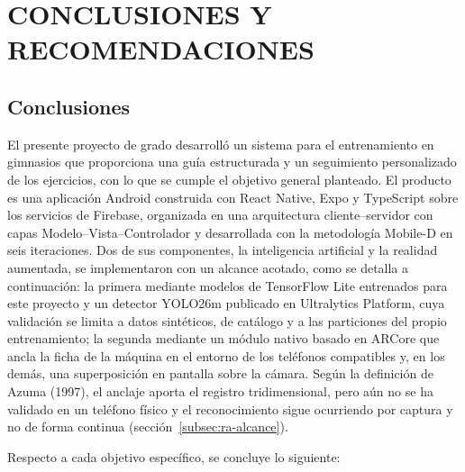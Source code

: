 \chapter{CONCLUSIONES Y RECOMENDACIONES}
\label{cap:conclusiones}

\section{Conclusiones}
\label{sec:conclusiones}

El presente proyecto de grado desarrolló un sistema para el entrenamiento en
gimnasios que proporciona una guía estructurada y un seguimiento personalizado
de los ejercicios, con lo que se cumple el objetivo general planteado. El
producto es una aplicación Android construida con React Native, Expo y
TypeScript sobre los servicios de Firebase, organizada en una arquitectura
cliente--servidor con capas Modelo--Vista--Controlador y desarrollada con la
metodología Mobile-D en seis iteraciones. Dos de sus componentes, la
inteligencia artificial y la realidad aumentada, se implementaron con un
alcance acotado, como se detalla a continuación: la primera mediante modelos de
TensorFlow Lite entrenados para este proyecto y un detector YOLO26m publicado en Ultralytics Platform, cuya validación se limita a datos sintéticos, de
catálogo y a las particiones del propio entrenamiento; la segunda mediante un módulo
nativo basado en ARCore que ancla la ficha de la máquina en el entorno de los
teléfonos compatibles y, en los demás, una superposición en pantalla sobre la
cámara. Según la definición de Azuma (1997), el anclaje aporta el registro
tridimensional, pero aún no se ha validado en un teléfono físico y el
reconocimiento sigue ocurriendo por captura y no de forma continua
(sección~\ref{subsec:ra-alcance}).

Respecto a cada objetivo específico, se concluye lo siguiente:

